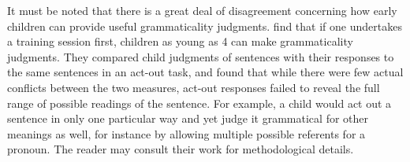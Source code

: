 It must be noted that there is a great deal of disagreement concerning how early children can provide useful grammaticality judgments. \citet{McDanielEtAl1990} find that if one undertakes a training session first, children as young as 4 can make grammaticality judgments. They compared child judgments of sentences with their responses to the same sentences in an act-out task, and found that while there were few actual conflicts between the two measures, act-out responses failed to reveal the full range of possible readings of the sentence. For example, a child would act out a sentence in only one particular way and yet judge it grammatical for other meanings as well, for instance by allowing multiple possible referents for a pronoun. The reader may consult their work for methodological details.

